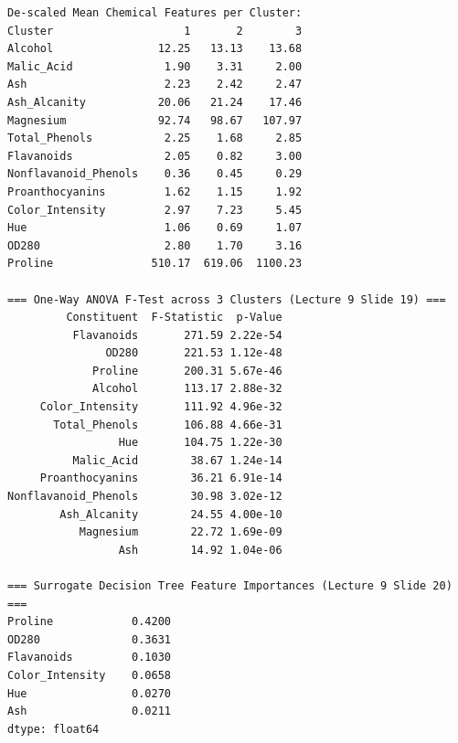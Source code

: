 \begin{lstlisting}[style=output]
De-scaled Mean Chemical Features per Cluster:
Cluster                    1       2        3
Alcohol                12.25   13.13    13.68
Malic_Acid              1.90    3.31     2.00
Ash                     2.23    2.42     2.47
Ash_Alcanity           20.06   21.24    17.46
Magnesium              92.74   98.67   107.97
Total_Phenols           2.25    1.68     2.85
Flavanoids              2.05    0.82     3.00
Nonflavanoid_Phenols    0.36    0.45     0.29
Proanthocyanins         1.62    1.15     1.92
Color_Intensity         2.97    7.23     5.45
Hue                     1.06    0.69     1.07
OD280                   2.80    1.70     3.16
Proline               510.17  619.06  1100.23

=== One-Way ANOVA F-Test across 3 Clusters (Lecture 9 Slide 19) ===
         Constituent  F-Statistic  p-Value
          Flavanoids       271.59 2.22e-54
               OD280       221.53 1.12e-48
             Proline       200.31 5.67e-46
             Alcohol       113.17 2.88e-32
     Color_Intensity       111.92 4.96e-32
       Total_Phenols       106.88 4.66e-31
                 Hue       104.75 1.22e-30
          Malic_Acid        38.67 1.24e-14
     Proanthocyanins        36.21 6.91e-14
Nonflavanoid_Phenols        30.98 3.02e-12
        Ash_Alcanity        24.55 4.00e-10
           Magnesium        22.72 1.69e-09
                 Ash        14.92 1.04e-06

=== Surrogate Decision Tree Feature Importances (Lecture 9 Slide 20) ===
Proline            0.4200
OD280              0.3631
Flavanoids         0.1030
Color_Intensity    0.0658
Hue                0.0270
Ash                0.0211
dtype: float64
\end{lstlisting}

